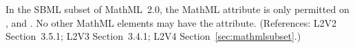 In the SBML subset of MathML~2.0, the MathML attribute
 is only permitted on ,
 and .  No other
MathML elements may have the  attribute.
(References: L2V2 Section~3.5.1; L2V3 Section~3.4.1; 
L2V4 Section~\ref{sec:mathmlsubset}.)
